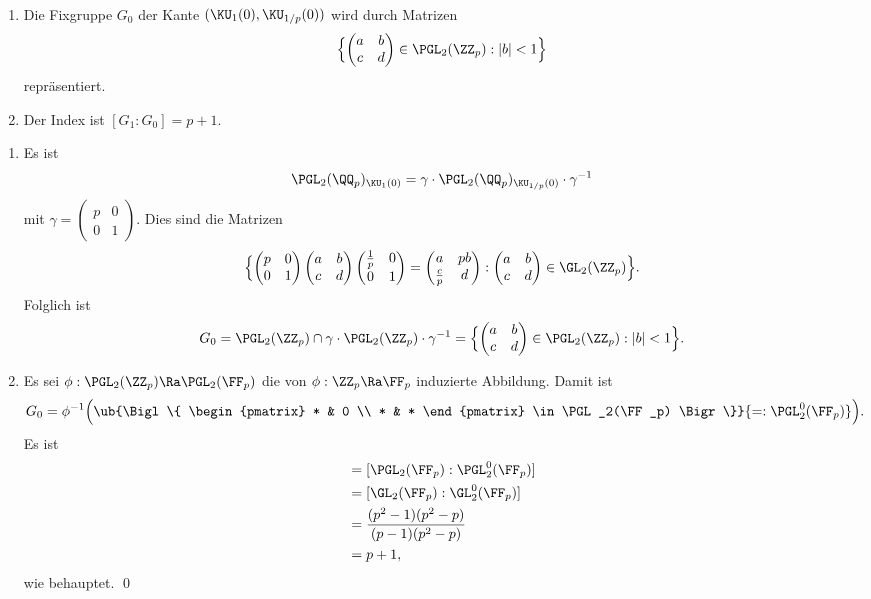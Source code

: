 \FOLG\ \begin{enumerate}
\item Die Fixgruppe $G_0$ der Kante $(\KU_1(0),\KU_{1/p}(0))$
wird durch Matrizen
\[
\Bigl\{
\begin{pmatrix}
a & b \\
c & d
\end{pmatrix}\in\PGL_2(\ZZ_p) : |b|<1
\Bigr\}
\]
repräsentiert.
\item Der Index ist $[G_1:G_0]=p+1$.
\end{enumerate}
\bew \begin{enumerate}
\item Es ist
\[
\PGL_2(\QQ_p)_{\KU_1(0)}
=\gamma\cdot\PGL_2(\QQ_p)_{\KU_{1/p}(0)}\cdot\gamma^{-1}
\]
mit $\gamma=\begin{pmatrix}
p & 0 \\
0 & 1
\end{pmatrix}$.
Dies sind die Matrizen
\[
\Bigl\{
\begin{pmatrix}
p & 0 \\
0 & 1
\end{pmatrix}
\begin{pmatrix}
a & b \\
c & d
\end{pmatrix}
\begin{pmatrix}
\frac{1}{p} & 0 \\
0 & 1
\end{pmatrix}
=\begin{pmatrix}
a & pb \\
\frac{c}{p} & d
\end{pmatrix}:
\begin{pmatrix}
a & b \\
c & d
\end{pmatrix}\in\GL_2(\ZZ_p)
\Bigr\}.
\]
Folglich ist
\[
G_0 = \PGL_2(\ZZ_p) \cap \gamma\cdot\PGL_2(\ZZ_p)\cdot\gamma^{-1}
=
\Bigl\{
\begin{pmatrix}
a & b \\
c & d
\end{pmatrix}\in\PGL_2(\ZZ_p):|b|<1
\Bigr\}.
\]
\item Es sei $\phi:\PGL_2(\ZZ_p)\Ra\PGL_2(\FF_p)$ die von
$\phi:\ZZ_p\Ra\FF_p$ induzierte Abbildung. Damit ist
\[
G_0=\phi^{-1}\Bigl(
\ub{\Bigl\{
\begin{pmatrix}
* & 0 \\
* & *
\end{pmatrix}
\in\PGL_2(\FF_p)
\Bigr\}}{=:\PGL_2^0(\FF_p)}
\Bigr).
\]
Es ist
\begin{align*}
[G_1:G_0] &= [\PGL_2(\FF_p):\PGL_2^0(\FF_p)] \\
&= [\GL_2(\FF_p):\GL_2^0(\FF_p)] \\
&=\frac{(p^2-1)(p^2-p)}{(p-1)(p^2-p)} \\
&=p+1,
\end{align*}
wie behauptet.
\qed
\end{enumerate}

